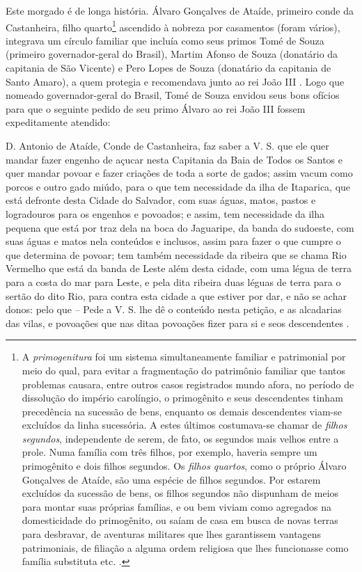 Este morgado é de longa história. Álvaro Gonçalves de Ataíde, primeiro conde da Castanheira, filho quarto\footnote{A \textit{primogenitura} foi um sistema simultaneamente familiar e patrimonial por meio do qual, para evitar a fragmentação do patrimônio familiar que tantos problemas causara, entre outros casos registrados mundo afora, no período de dissolução do império carolíngio, o primogênito e seus descendentes tinham precedência na sucessão de bens, enquanto os demais descendentes viam-se excluídos da linha sucessória. A estes últimos costumava-se chamar de \textit{filhos segundos}, independente de serem, de fato, os segundos mais velhos entre a prole. Numa família com três filhos, por exemplo, haveria sempre um primogênito e dois filhos segundos. Os \textit{filhos quartos}, como o próprio Álvaro Gonçalves de Ataíde, são uma espécie de filhos segundos. Por estarem excluídos da sucessão de bens, os filhos segundos não dispunham de meios para montar suas próprias famílias, e ou bem viviam como agregados na domesticidade do primogênito, ou saíam de casa em busca de novas terras para desbravar, de aventuras militares que lhes garantissem vantagens patrimoniais, de filiação a alguma ordem religiosa que lhes funcionasse como família substituta etc. \cite{BERNARDO1997,coelho_vincular_1980} . } ascendido à nobreza por casamentos (foram vários), integrava um círculo familiar que incluía como seus primos Tomé de Souza (primeiro governador-geral do Brasil), Martim Afonso de Souza (donatário da capitania de São Vicente) e Pero Lopes de Souza (donatário da capitania de Santo Amaro), a quem protegia e recomendava junto ao rei João III \cite[p.~III-3]{teixeira_doacoes_1978}. Logo que nomeado governador-geral do Brasil, Tomé de Souza envidou seus bons ofícios para que o seguinte pedido de seu primo Álvaro ao rei João III fossem expeditamente atendido:

\begin{citacao}
D. Antonio de Ataíde, Conde de Castanheira, faz saber a V. S. que ele quer mandar fazer engenho de açucar nesta Capitania da Baia de Todos os Santos e quer mandar povoar e fazer criações de toda a sorte de gados; assim vacum como porcos e outro gado miúdo, para o que tem necessidade da ilha de Itaparica, que está defronte desta Cidade do Salvador, com suas águas, matos, pastos e logradouros para os engenhos e povoados; e assim, tem necessidade da ilha pequena que está por traz dela na boca do Jaguaripe, da banda do sudoeste, com suas águas e matos nela conteúdos e inclusos, assim para fazer o que cumpre o que determina de povoar; tem também necessidade da ribeira que se chama Rio Vermelho que está da banda de Leste além desta cidade, com uma légua de terra para a costa do mar para Leste, e pela dita ribeira duas léguas de terra para o sertão do dito Rio, para contra esta cidade a que estiver por dar, e não se achar donos: pelo que -- Pede a V. S. lhe dê o conteúdo nesta petição, e as alcadarias das vilas, e povoações que nas ditaa povoações fizer para si e seos descendentes \cite[p.~III-3]{teixeira_doacoes_1978}.
\end{citacao}

